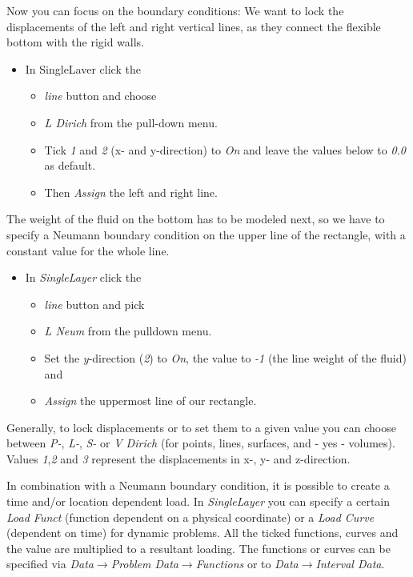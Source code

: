 Now you can focus on the boundary conditions: We want to lock the
displacements of the left and right vertical lines, as they connect
the flexible bottom with the rigid walls. 

\begin{itemize}
\item In SingleLaver click the \emph{}

\begin{itemize}
\item \emph{line} button and choose 
\item \emph{L Dirich} from the pull-down menu. 
\item Tick \emph{1} and \emph{2} (x- and y-direction) to \emph{On} and leave
the values below to \emph{0.0} as default.
\item Then \emph{Assign} the left and right line.
\end{itemize}
\end{itemize}
The weight of the fluid on the bottom has to be modeled next, so we
have to specify a Neumann boundary condition on the upper line of
the rectangle, with a constant value for the whole line. 

\begin{itemize}
\item In \emph{SingleLayer} click the 

\begin{itemize}
\item \emph{line} button and pick 
\item \emph{L Neum} from the pulldown menu.
\item Set the \emph{y}-direction (\emph{2}) to \emph{On}, the value to \emph{-1}
(the line weight of the fluid) and 
\item \emph{Assign} the uppermost line of our rectangle.
\end{itemize}
\end{itemize}
Generally, to lock displacements or to set them to a given value you
can choose between \emph{P-}, \emph{L-}, \emph{S-} or \emph{V Dirich}
(for points, lines, surfaces, and - yes - volumes). Values \emph{1},\emph{2}
and \emph{3} represent the displacements in x-, y- and z-direction.

In combination with a Neumann boundary condition, it is possible to
create a time and/or location dependent load. In \emph{SingleLayer}
you can specify a certain \emph{Load Funct} (function dependent on
a physical coordinate) or a \emph{Load Curve} (dependent on time)
for dynamic problems. All the ticked functions, curves and the value
are multiplied to a resultant loading. The functions or curves can
be specified via \emph{Data$\to$Problem Data$\to$Functions} or to
\emph{Data$\to$Interval Data}.


